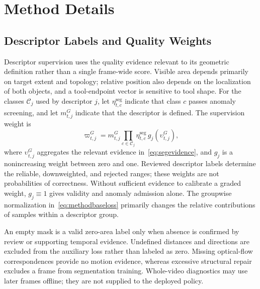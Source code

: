 \section{Method Details}
\label{app:methoddetails}

\subsection{Descriptor Labels and Quality Weights}
\label{app:seguncertainty}
\label{app:visibilityextension}
Descriptor supervision uses the quality evidence relevant to its geometric definition rather than a single frame-wide score.
Visible area depends primarily on target extent and topology; relative position also depends on the localization of both objects, and a tool-endpoint vector is sensitive to tool shape.
For the classes $\mathcal C_j$ used by descriptor $j$, let $\eta_{t,c}^{\mathrm{seg}}$ indicate that class $c$ passes anomaly screening, and let $m_{t,j}^{G}$ indicate that the descriptor is defined.
The supervision weight is
\begin{equation}
 \varpi_{t,j}^{G}
 =m_{t,j}^{G}
  \prod_{c\in\mathcal C_j}\eta_{t,c}^{\mathrm{seg}}\,
  g_j(\upsilon_{t,j}^{G}),
 \label{eq:relationadmission}
\end{equation}
where $\upsilon_{t,j}^{G}$ aggregates the relevant evidence in~\eqref{eq:segevidence}, and $g_j$ is a nonincreasing weight between zero and one.
Reviewed descriptor labels determine the reliable, downweighted, and rejected ranges; these weights are not probabilities of correctness.
Without sufficient evidence to calibrate a graded weight, $g_j\equiv1$ gives validity and anomaly admission alone.
The groupwise normalization in~\eqref{eq:methodbaseloss} primarily changes the relative contributions of samples within a descriptor group.

An empty mask is a valid zero-area label only when absence is confirmed by review or supporting temporal evidence.
Undefined distances and directions are excluded from the auxiliary loss rather than labeled as zero.
Missing optical-flow correspondences provide no motion evidence, whereas excessive structural repair excludes a frame from segmentation training.
Whole-video diagnostics may use later frames offline; they are not supplied to the deployed policy.

